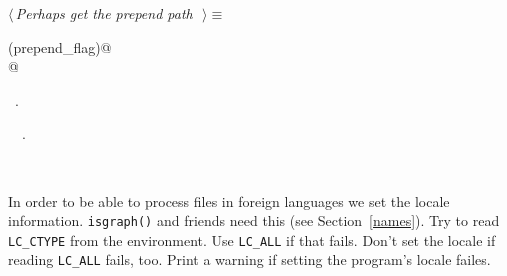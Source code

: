 \documentclass{report}
\begin{document}
\begin{flushleft} \small
\begin{minipage}{\linewidth} \label{scrap25}
$\langle\,${\it Perhaps get the prepend path}\nobreak\ {\footnotesize {}}$\,\rangle\equiv$
\vspace{-1ex}
\begin{list}{}{} \item
\mbox{}\verb@if (prepend_flag)@\\
\mbox{}@\\
\mbox{}\verb@@{\NWsep}
\end{list}
\vspace{-1ex}
\footnotesize\addtolength{\baselineskip}{-1ex}
\begin{list}{}{\setlength{\itemsep}{-\parsep}\setlength{\itemindent}{-\leftmargin}}
\item \NWtxtMacroRefIn\ .
\end{list}
\vspace{-2ex}
\footnotesize\addtolength{\baselineskip}{-1ex}
\begin{list}{}{\setlength{\itemsep}{-\parsep}\setlength{\itemindent}{-\leftmargin}}
\item \NWtxtIdentsUsed\nobreak\  \verb@FALSE@\nobreak\ .\end{list}
\end{minipage}\\[4ex]
\end{flushleft}
In order to be able to process files in foreign languages we
set the locale information. \texttt{isgraph()} and friends need
this (see Section~\ref{names}).
Try to read \texttt{LC\_CTYPE} from the environment. Use \texttt{LC\_ALL}
if that fails. Don't set the locale if reading \texttt{LC\_ALL} fails, too.
Print a warning if setting the program's locale failes.
\end{document}
